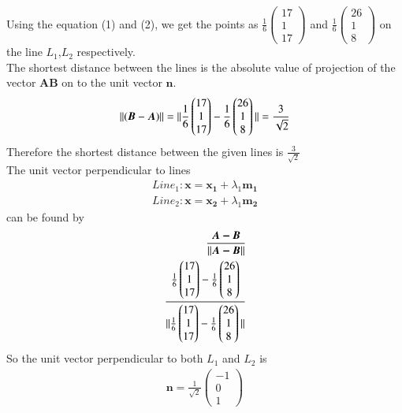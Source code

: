 \documentclass[journal,12pt,twocolumn]{IEEEtran}
\newcommand{\norm}[1]{\| #1 \|}
\begin{document}
Using the equation (1) and (2), we get the points as $\frac{1}{6}\begin{pmatrix}17\\1\\17\end{pmatrix}$ and $\frac{1}{6}\begin{pmatrix}26\\1\\8\end{pmatrix}$ on the line $L_1$,$L_2$ respectively.\\
\vspace{5mm}
The shortest distance between the lines is the absolute value of projection of the vector $\bm{AB}$ on to the unit vector $\bm{n}$.
\begin{equation}
    \norm{(\bm{B}-\bm{A})}\\
    =\norm{\frac{1}{{6}}\begin{pmatrix}17\\1\\17\end{pmatrix}-\frac{1}{{6}}\begin{pmatrix}26\\1\\8\end{pmatrix}}\\
    =\frac{3}{\sqrt{2}}
\end{equation}
Therefore the shortest distance between the given lines is $\frac{3}{\sqrt{2}}$\\
The unit vector perpendicular to lines \\
\begin{align}
    Line_1\colon \bm{x}=\bm{x_1}+\lambda_1\bm{m_1}\\
    Line_2\colon \bm{x}=\bm{x_2}+\lambda_1\bm{m_2}
\end{align}
can be found by 
\begin{align}
    \frac{\bm{A-B}}{\norm{\bm{A-B}}}\\
    \frac{\frac{1}{{6}}\begin{pmatrix}17\\1\\17\end{pmatrix}-\frac{1}{{6}}\begin{pmatrix}26\\1\\8\end{pmatrix}}{\norm{\frac{1}{{6}}\begin{pmatrix}17\\1\\17\end{pmatrix}-\frac{1}{{6}}\begin{pmatrix}26\\1\\8\end{pmatrix}}}\notag
\end{align}
So the unit vector perpendicular to both $L_1$ and $L_2$ is
\begin{align}
    \bm{n}=\frac{1}{\sqrt{2}}\begin{pmatrix}-1\\0\\1\end{pmatrix}
\end{align}
\end{document}

